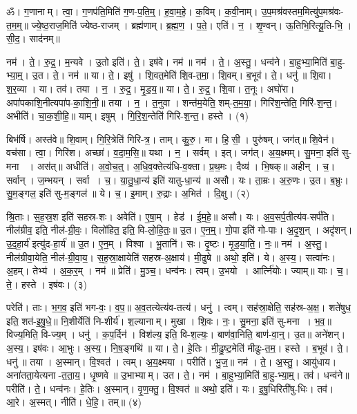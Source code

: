 
ॐ। ग॒णानाम्। त्वा॒। ग॒णप॑ति॒मिति॑ ग॒ण-प॒ति॒म्॒। ह॒वा॒म॒हे॒। क॒विम्। क॒वी॒नाम्। उ॒प॒मश्र॑वस्तम॒मित्यु॑प॒मश्र॑वः-त॒म॒म्॒॥ 
ज्ये॒ष्ठ॒राज॒मिति॑ ज्येष्ठ-राजम्। ब्रह्म॑णाम्। ब्र॒ह्म॒ण॒। प॒ते॒। एति॑। न॒। शृ॒ण्वन्। ऊ॒तिभि॒रित्यू॒ति-भि॒। सी॒द॒। साद॑नम्॥ 


नम॑। ते॒। रु॒द्र॒। म॒न्यवे। उ॒तो इति॑। ते॒। इष॑वे। नम॑॥ 
नम॑। ते॒। अ॒स्तु॒। धन्व॑ने। बा॒हुभ्या॒मिति॑ बा॒हु-भ्या॒म्॒। उ॒त। ते॒। नम॑॥ 
या। ते॒। इषु॑। शि॒वत॒मेति॑ शि॒व-त॒मा॒। शि॒वम्। ब॒भूव॑। ते॒। धनु॑॥ 
शि॒वा। श॒र॒व्या। या। तव॑। तया। न॒। रु॒द्र॒। मृ॒ड॒य॒॥ 
या। ते॒। रु॒द्र॒। शि॒वा। त॒नूः। अघो॑रा। अपा॑पकाशि॒नीत्यपा॑प-का॒शि॒नी॒॥ 
तया। न॒। त॒नुवा। शन्त॑म॒येति॒ शम्-त॒म॒या॒। गिरि॑श॒न्तेति॒ गिरि॑-श॒न्त॒। अभीति॑। चा॒क॒शी॒हि॒॥ 
याम्। इषुम्। गि॒रि॒श॒न्तेति॑ गिरि-श॒न्त॒। हस्ते। (१)


बिभ॑र्षि। अस्त॑वे॥ 
शि॒वाम्। गि॒रि॒त्रेति॑ गिरि-त्र॒। ताम्। कु॒रु॒। मा। हि॒सी॒। पुरु॑षम्। जग॑त्॥ 
शि॒वेन॑। वच॑सा। त्वा॒। गिरि॑श। अच्छा॑। व॒दा॒म॒सि॒॥ 
यथा। न॒। सर्वम्। इत्। जग॑त्। अ॒य॒क्ष्मम्। सु॒मना॒ इति॑ सु-मना । अस॑त्॥ 
अधीति॑। अ॒वो॒च॒त्॒। अ॒धि॒व॒क्तेत्य॑धि-व॒क्ता। प्र॒थ॒मः। दैव्य॑। भि॒षक्॥ 
अहीन्। च॒। सर्वान्। ज॒म्भयन्। सर्वा। च॒। या॒तु॒धा॒न्य॑ इति॑ यातु-धा॒न्य॑॥ 
असौ। यः। ता॒म्रः। अ॒रु॒णः। उ॒त। ब॒भ्रुः। सु॒म॒ङ्गल॒ इति॑ सु-म॒ङ्गल॑॥ 
ये। च॒। इ॒माम्। रु॒द्राः। अ॒भित॑। दि॒क्षु। (२)


श्रि॒ताः। स॒ह॒स्र॒श इति॑ सहस्र-शः। अवेति॑। ए॒षा॒म्। हेड॑। ई॒म॒हे॒॥ 
असौ। यः। अ॒व॒सर्प॒तीत्य॑व-सर्प॑ति। नील॑ग्रीव॒ इति॒ नील॑-ग्री॒वः॒। विलो॑हित॒ इति॒ वि-लो॒हि॒तः॒॥ 
उ॒त। ए॒न॒म्॒। गो॒पा इति॑ गो-पाः। अ॒दृ॒श॒न्। अदृ॑शन्। उ॒द॒हा॒र्य॑ इत्यु॑द-हा॒र्य॑॥ 
उ॒त। ए॒न॒म्। विश्वा। भू॒तानि॑। सः। दृ॒ष्टः। मृ॒ड॒या॒ति॒। नः॒॥ 
नम॑। अ॒स्तु॒। नील॑ग्रीवा॒येति॒ नील॑-ग्री॒वा॒य॒। स॒ह॒स्रा॒क्षायेति॑ सहस्र-अ॒क्षाय॑। मी॒ढुषे॥
अथो॒ इति॑। ये। अ॒स्य॒। सत्वा॑नः। अ॒हम्। तेभ्य॑। अ॒क॒र॒म्। नम॑॥ 
प्रेति॑। मु॒ञ्च॒। धन्व॑नः। त्वम्। उ॒भयो। आर्त्नि॑योः। ज्याम्॥ 
याः। च॒। ते॒। हस्ते। इष॑वः। (३)


परेति॑। ताः। भ॒ग॒व॒ इति॑ भग-वः॒। व॒प॒॥ 
अ॒व॒तत्येत्य॑व-तत्य॑। धनु॑। त्वम्। सह॑स्रा॒क्षेति॒ सह॑स्र-अ॒क्ष॒। शते॑षुध॒ इति॒ शत॑-इ॒षु॒धे॒॥ 
नि॒शीर्येति॑ नि-शीर्य॑। श॒ल्यानाम्। मुखा। शि॒वः। नः॒। सु॒मना॒ इति॑ सु-मना। भ॒व॒॥ 
विज्य॒मिति॒ वि-ज्य॒म्। धनु॑। क॒प॒र्दिन॑। विश॑ल्य॒ इति॒ वि-श॒ल्यः॒। बाण॑वा॒निति॒ बाण॑-वा॒न्॒। उ॒त॥ 
अने॑शन्। अ॒स्य॒। इष॑वः। आ॒भुः। अ॒स्य॒। नि॒ष॒ङ्गथि॑॥ 
या। ते॒। हे॒तिः। मी॒ढु॒ष्ट॒मेति॑ मीढुः-त॒म॒। हस्ते। ब॒भूव॑। ते॒। धनु॑॥ 
तया। अ॒स्मान्। वि॒श्वत॑। त्वम्। अ॒य॒क्ष्मया। परीति॑। भु॒ज॒॥ 
नम॑। ते॒। अ॒स्तु॒। आयु॑धाय। अना॑तता॒येत्यना-त॒ता॒य॒। धृ॒ष्णवे॥ 
उ॒भाभ्याम्। उत। ते॒। नम॑। बा॒हुभ्या॒मिति॑ बा॒हु-भ्या॒म्॒। तव॑। धन्व॑ने॥ 
परीति॑। ते॒। धन्व॑नः। हे॒तिः। अ॒स्मान्। वृ॒ण॒क्तु॒। वि॒श्वत॑॥
 अथो॒ इति॑। यः। इ॒षु॒धिरिती॑षु-धिः। तव॑। आ॒रे। अ॒स्मत्। नीति॑। धे॒हि॒। तम्॥ (४)


